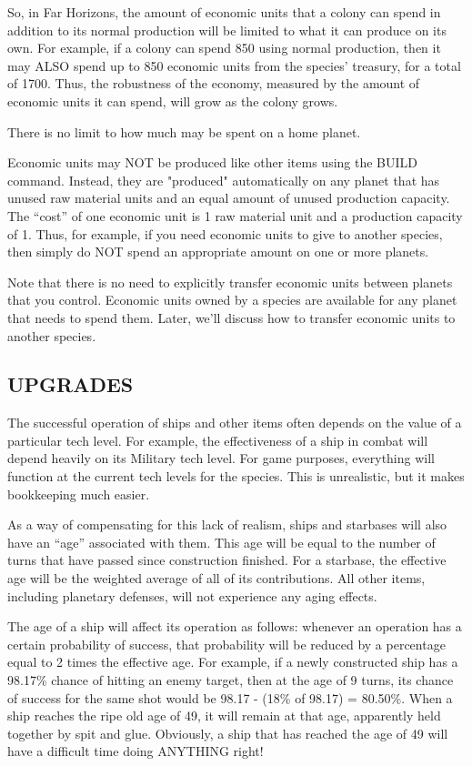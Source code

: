 \documentclass[10pt,titlepage]{article}
\begin{document}
So, in Far Horizons, the amount of economic units that a colony can spend in
addition to its normal production will be limited to what it can produce on its
own.  For example, if a colony can spend 850 using normal production, then it
may ALSO spend up to 850 economic units from the species' treasury, for a total
of 1700.  Thus, the robustness of the economy, measured by the amount of
economic units it can spend, will grow as the colony grows.

There is no limit to how much may be spent on a home planet.

Economic units may NOT be produced like other items using the BUILD command.
Instead, they are "produced" automatically on any planet that has unused raw
material units and an equal amount of unused production capacity.  The ``cost''
of one economic unit is 1 raw material unit and a production capacity of 1.
Thus, for example, if you need economic units to give to another species, then
simply do NOT spend an appropriate amount on one or more planets.

Note that there is no need to explicitly transfer economic units between
planets that you control.  Economic units owned by a species are available for
any planet that needs to spend them.  Later, we'll discuss how to transfer
economic units to another species.


\subsection{UPGRADES}
\label{sec:upgrades}


The successful operation of ships and other items often depends on the value of
a particular tech level.  For example, the effectiveness of a ship in combat
will depend heavily on its Military tech level.  For game purposes, everything
will function at the current tech levels for the species.  This is unrealistic,
but it makes bookkeeping much easier.

As a way of compensating for this lack of realism, ships and starbases will
also have an ``age'' associated with them.  This age will be equal to the number
of turns that have passed since construction finished.  For a starbase, the
effective age will be the weighted average of all of its contributions.  All
other items, including planetary defenses, will not experience any aging
effects.

The age of a ship will affect its operation as follows: whenever an operation
has a certain probability of success, that probability will be reduced by
a percentage equal to 2 times the effective age.  For example, if a newly
constructed ship has a 98.17\% chance of hitting an enemy target, then at the
age of 9 turns, its chance of success for the same shot would be 98.17 - (18\%
of 98.17) = 80.50\%.  When a ship reaches the ripe old age of 49, it will remain
at that age, apparently held together by spit and glue.  Obviously, a ship that
has reached the age of 49 will have a difficult time doing ANYTHING right!
\end{document}
